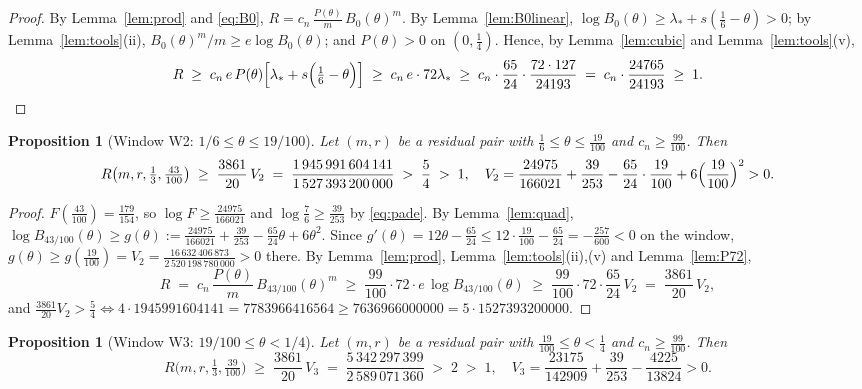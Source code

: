 \documentclass[11pt]{amsart}
\newtheorem{proposition}[theorem]{Proposition}
\theoremstyle{remark}
\begin{document}
\begin{proof}
By Lemma~\ref{lem:prod} and \eqref{eq:B0}, $R=c_n\,\frac{P(\theta)}m\,B_0(\theta)^m$.  By Lemma~\ref{lem:B0linear}, $\log B_0(\theta)\ge\lambda_*+s(\tfrac16-\theta)>0$; by Lemma~\ref{lem:tools}(ii), $B_0(\theta)^m/m\ge e\log B_0(\theta)$; and $P(\theta)>0$ on $(0,\tfrac14)$.  Hence, by Lemma~\ref{lem:cubic} and Lemma~\ref{lem:tools}(v),
\[
        R\;\ge\;c_n\,e\,P(\theta)\Bigl[\lambda_*+s\Bigl(\tfrac16-\theta\Bigr)\Bigr]
        \;\ge\;c_n\,e\cdot72\lambda_*
        \;\ge\;c_n\cdot\frac{65}{24}\cdot\frac{72\cdot127}{24193}
        \;=\;c_n\cdot\frac{24765}{24193}\;\ge\;1 . \qedhere
\]
\end{proof}

\begin{proposition}[Window W2: $1/6\le\theta\le19/100$]\label{prop:W2}
Let $(m,r)$ be a residual pair with $\tfrac16\le\theta\le\tfrac{19}{100}$ and $c_n\ge\tfrac{99}{100}$.  Then
\[
        R\bigl(m,r,\tfrac13,\tfrac{43}{100}\bigr)
        \;\ge\;\frac{3861}{20}\,V_2\;=\;
        \frac{1\,945\,991\,604\,141}{1\,527\,393\,200\,000}\;>\;\frac54\;>\;1,
        \quad
        V_2=\frac{24975}{166021}+\frac{39}{253}
        -\frac{65}{24}\cdot\frac{19}{100}+6\Bigl(\frac{19}{100}\Bigr)^2>0 .
\]
\end{proposition}

\begin{proof}
$F(\tfrac{43}{100})=\tfrac{179}{154}$, so $\log F\ge\tfrac{24975}{166021}$ and $\log\tfrac76\ge\tfrac{39}{253}$ by \eqref{eq:pade}.  By Lemma~\ref{lem:quad},
$\log B_{43/100}(\theta)\ge g(\theta):=\tfrac{24975}{166021}+\tfrac{39}{253}-\tfrac{65}{24}\theta+6\theta^2$.
Since $g'(\theta)=12\theta-\tfrac{65}{24}\le12\cdot\tfrac{19}{100}-\tfrac{65}{24}=-\tfrac{257}{600}<0$ on the window, $g(\theta)\ge g(\tfrac{19}{100})=V_2=\tfrac{16\,632\,406\,873}{2\,520\,198\,780\,000}>0$ there.  By Lemma~\ref{lem:prod}, Lemma~\ref{lem:tools}(ii),(v) and Lemma~\ref{lem:P72},
\[
        R\;=\;c_n\,\frac{P(\theta)}m\,B_{43/100}(\theta)^m
        \;\ge\;\frac{99}{100}\cdot72\cdot e\,\log B_{43/100}(\theta)
        \;\ge\;\frac{99}{100}\cdot72\cdot\frac{65}{24}\,V_2
        \;=\;\frac{3861}{20}\,V_2 ,
\]
and $\tfrac{3861}{20}V_2>\tfrac54\iff4\cdot1945991604141=7783966416564\ge7636966000000=5\cdot1527393200000$.
\end{proof}

\begin{proposition}[Window W3: $19/100\le\theta<1/4$]\label{prop:W3}
Let $(m,r)$ be a residual pair with $\tfrac{19}{100}\le\theta<\tfrac14$ and $c_n\ge\tfrac{99}{100}$.  Then
\[
        R\bigl(m,r,\tfrac13,\tfrac{39}{100}\bigr)
        \;\ge\;\frac{3861}{20}\,V_3\;=\;
        \frac{5\,342\,297\,399}{2\,589\,071\,360}\;>\;2\;>\;1,
        \quad
        V_3=\frac{23175}{142909}+\frac{39}{253}-\frac{4225}{13824}>0 .
\]
\end{proposition}
\end{document}
